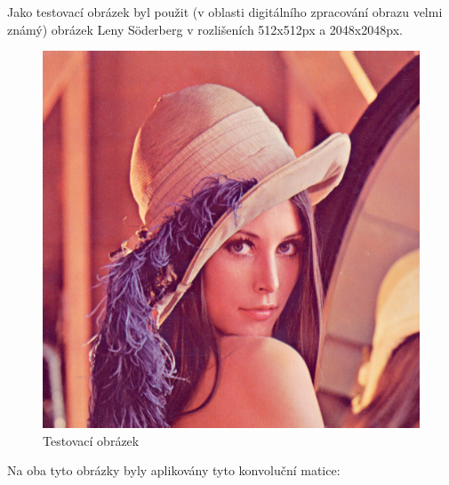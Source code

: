 \documentclass[10pt,a4paper]{article}
\begin{document}
Jako testovací obrázek byl použit (v oblasti digitálního zpracování obrazu velmi známý) obrázek Leny Söderberg v rozlišeních 512x512px a 2048x2048px.

\begin{figure}[H]
\centering
\includegraphics[scale=0.3]{images/lenna.png}
\caption{Testovací obrázek} 
\label{lenna}
\end{figure}

Na oba tyto obrázky byly aplikovány tyto konvoluční matice:
\end{document}

